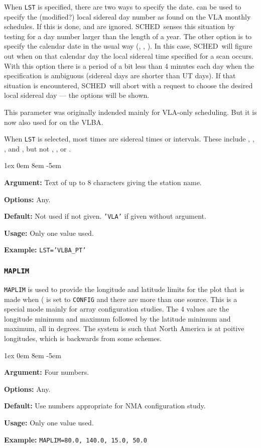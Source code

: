 \documentclass{report}
\newcommand{\schedb}{{\sc SCHED~}}
\newcommand{\rcwbox}[5]{
  \begin{list}{}{\parsep 1ex  \itemsep 0em
                 \leftmargin 8em  \itemindent -5em }
    \item {\bf Argument:} #1
    \item {\bf Options:}  #2
    \item {\bf Default:}  #3
    \item {\bf Usage:}    #4
    \item {\bf Example:}  #5
  \end{list}
}
\begin{document}
When {\tt LST} is specified, there are two ways to specify the date.
 can be used to specify the (modified?)
local sidereal day number as found on the VLA monthly schedules.  If
this is done,  and  are ignored. \schedb senses this situation by
testing for a day number larger than the length of a year.  The other
option is to specify the calendar date in the usual way (, , ).  In this case, \schedb will figure out when on that
calendar day the local sidereal time specified for a scan occurs.
With this option there is a period of a bit less than 4 minutes each
day when the specification is ambiguous (sidereal days are shorter than
UT days).  If that situation is encountered, \schedb will abort with
a request to choose the desired local sidereal day --- the options
will be shown.

This parameter was originally indended mainly for VLA-only scheduling.
But it is now also used for 
on the VLBA.

When {\tt LST} is selected, most times are sidereal times or
intervals.  These include ,
, , and
, but not , , or
.

\rcwbox
{Text of up to 8 characters giving the station name.}
{Any.}
{Not used if not given. {\tt 'VLA'} if given without argument.}
{Only one value used.}
{{\tt LST='VLBA\_PT'}}

\subsubsection{\label{MP:MAPLIM}{\tt MAPLIM}}

{\tt MAPLIM} is used to provide the longitude and latitude limits for
the plot that is made when ( is
set to {\tt CONFIG} and there are more than one source.  This is
a special mode mainly for array configuration studies.  The 4
values are the longitude minimum and maximum followed by the
latitude minimum and maximum, all in degrees.  The system is such
that North America is at poitive longitudes, which is backwards from
some schemes.

\rcwbox
{Four numbers.}
{Any.}
{Use numbers appropriate for NMA configuration study.}
{Only one value used.}
{{\tt MAPLIM=80.0, 140.0, 15.0, 50.0}}
\end{document}
